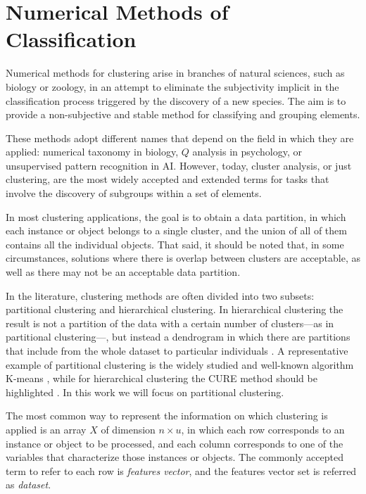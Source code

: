 \section{Numerical Methods of Classification} \label{sec:NumMethClassif}

Numerical methods for clustering arise in branches of natural sciences, such as biology or zoology, in an attempt to eliminate the subjectivity implicit in the classification process triggered by the discovery of a new species. The aim is to provide a non-subjective and stable method for classifying and grouping elements.

These methods adopt different names that depend on the field in which they are applied: numerical taxonomy in biology, $Q$ analysis in psychology, or unsupervised pattern recognition in \acf{AI}. However, today, cluster analysis, or just clustering, are the most widely accepted and extended terms for tasks that involve the discovery of subgroups within a set of elements.

In most clustering applications, the goal is to obtain a data partition, in which each instance or object belongs to a single cluster, and the union of all of them contains all the individual objects. That said, it should be noted that, in some circumstances, solutions where there is overlap between clusters are acceptable, as well as there may not be an acceptable data partition.

In the literature, clustering methods are often divided into two subsets: partitional clustering and hierarchical clustering. In hierarchical clustering the result is not a partition of the data with a certain number of clusters---as in partitional clustering---, but instead a dendrogram in which there are partitions that include from the whole dataset to particular individuals \cite{Everitt:2009:CA:1538772}. A representative example of partitional clustering is the widely studied and well-known algorithm K-means \cite{wu2009top}, while for hierarchical clustering the CURE method should be highlighted \cite{guha1998cure}. In this work we will focus on partitional clustering.

The most common way to represent the information on which clustering is applied is an array $X$ of dimension $n\times u$, in which each row corresponds to an instance or object to be processed, and each column corresponds to one of the variables that characterize those instances or objects. The commonly accepted term to refer to each row is \textit{features vector}, and the features vector set is referred as \textit{dataset}.


